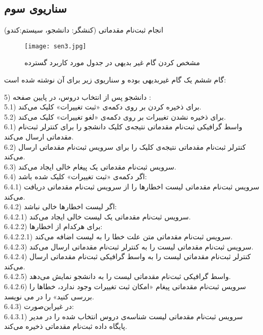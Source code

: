 \documentclass{report}
\begin{document}
\subsection*{سناریوی سوم}


\textbf{}
 انجام ثبت‌نام مقدماتی (کنشگر: دانشجو، سیستم:کندو)
\begin{figure}[!htb]
\centering
\texttt{[image: sen3.jpg]}
\caption{مشخص کردن گام غیر بدیهی در جدول مورد کاربرد گسترده}
\end{figure} 
\clearpage
گام ششم یک گام غیربدیهی بوده و سناریوی زیر برای آن نوشته شده است:

5) دانشجو پس از انتخاب دروس، در پایین صفحه :\\
5.1) برای ذخیره کردن بر روی دکمه‌ی «ثبت تغییرات» کلیک می‌کند.\\
5.2) برای ذخیره نشدن تغییرات بر روی دکمه‌ی «لغو تغییرات» کلیک می‌کند.\\
6.1) واسط گرافیکی ثبت‌نام مقدماتی نتیجه‌ی کلیک دانشجو را برای کنترلر ثبت‌نام مقدماتی ارسال می‌کند.\\
6.2) کنترلر ثبت‌نام مقدماتی نتیجه‌ی کلیک را برای سرویس ثبت‌نام مقدماتی ارسال می‌کند.\\
6.3) سرویس ثبت‌نام مقدماتی یک پیغام خالی 
 ایجاد می‌کند.\\
6.4) اگر دکمه‌ی «ثبت تغییرات» کلیک شده باشد:\\
6.4.1) سرویس ثبت‌نام مقدماتی لیست اخطارها را از سرویس ثبت‌نام مقدماتی دریافت می‌کند.\\
6.4.2) اگر لیست اخطارها خالی نباشد:\\
6.4.2.1) سرویس ثبت‌نام مقدماتی یک لیست خالی 
 ایجاد می‌کند.\\
6.4.2.2) برای هرکدام از اخطارها:\\
6.4.2.2.1) سرویس ثبت‌نام مقدماتی متن علت خطا را به لیست 
 اضافه می‌کند.\\
6.4.2.3) سرویس ثبت‌نام مقدماتی لیست 
 را به کنترلر ثبت‌نام مقدماتی ارسال می‌کند.\\
6.4.2.4) کنترلر ثبت‌نام مقدماتی لیست 
 را به واسط گرافیکی ثبت‌نام مقدماتی ارسال می‌کند.\\
6.4.2.5‌) واسط گرافیکی ثبت‌نام‌ مقدماتی لیست 
 را به دانشجو نمایش می‌دهد.\\
6.4.2.6) سرویس ثبت‌نام مقدماتی پیغام «امکان ثبت‌ تغییرات وجود ندارد، خطاها را بررسی کنید» را در
 می نویسد.\\
6.4.3) در غیر‌این‌صورت:\\
6.4.3.1) سرویس ثبت‌نام مقدماتی لیست شناسه‌ی دروس انتخاب شده را در مدیر پایگاه داده ثبت‌نام مقدماتی ذخیره می‌کند.\\
\end{document}
